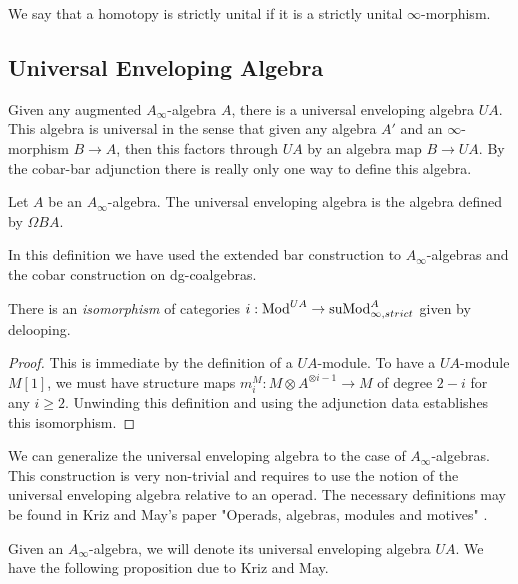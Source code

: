 \documentclass[../thesis.tex]{subfiles}
\begin{document}
            We say that a homotopy is strictly unital if it is a strictly unital $\infty$-morphism.

        \subsection{Universal Enveloping Algebra}

            Given any augmented $A_\infty$-algebra $A$, there is a universal enveloping algebra $UA$. This algebra is universal in the sense that given any algebra $A'$ and an $\infty$-morphism  $B \rightarrow A$, then this factors through $UA$ by an algebra map $B \rightarrow UA$. By the cobar-bar adjunction there is really only one way to define this algebra.

            \begin{definition}
                Let $A$ be an $A_\infty$-algebra. The universal enveloping algebra is the algebra defined by $\Omega BA$.
            \end{definition}
            \begin{remark}
                In this definition we have used the extended bar construction to $A_\infty$-algebras and the cobar construction on dg-coalgebras.
            \end{remark}

            \begin{lemma}\label{lem: Polydules-are-modules}
                There is an \textit{isomorphism} of categories $i : \tt{Mod}^{UA} \rightarrow \tt{suMod}_{\infty, strict}^{A}$ given by delooping.
            \end{lemma}
            \begin{proof}
                This is immediate by the definition of a $UA$-module. To have a $UA$-module $M[1]$, we must have structure maps $m_i^M : M \otimes A^{\otimes i-1} \rightarrow M$ of degree $2-i$ for any $i \geq 2$. Unwinding this definition and using the adjunction data establishes this isomorphism.
            \end{proof}

            We can generalize the universal enveloping algebra to the case of $A_\infty$-algebras. This construction is very non-trivial and requires to use the notion of the universal enveloping algebra relative to an operad. The necessary definitions may be found in Kriz and May's paper "Operads, algebras, modules and motives" \cite{Kriz95}.
            
            Given an $A_\infty$-algebra, we will denote its universal enveloping algebra $UA$. We have the following proposition due to Kriz and May.
\end{document}
